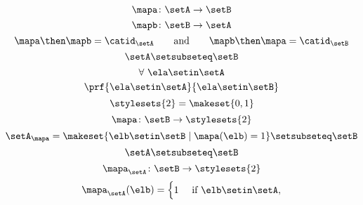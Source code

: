 \begin{forslides}
    \begin{equation}
        \label{eq:slides_session2_183}
        \mapa\colon \setA \to \setB
    \end{equation}
    \begin{equation}
        \label{eq:slides_session2_184}
        \mapb \colon \setB \to \setA
    \end{equation}
    \begin{equation}
        \label{eq:slides_session2_185}
        \mapa \then \mapb = \catid_\setA \qquad \text{and}  \qquad \mapb \then \mapa = \catid_\setB
    \end{equation}
    \begin{equation}
        \label{eq:slides_session2_186}
        \setA \setsubseteq \setB
    \end{equation}
    \begin{equation}
        \label{eq:slides_session2_187}
        \forall \ \ela \setin\setA
    \end{equation}
    \begin{equation}
        \label{eq:slides_session2_188}
        \prf{
            \ela \setin\setA
        }{
            \ela \setin\setB
        }
    \end{equation}
    \begin{equation}
        \label{eq:slides_session2_189}
        \stylesets{2} = \makeset{ 0, 1}
    \end{equation}
    \begin{equation}
        \label{eq:slides_session2_190}
        \mapa \colon \setB \to \stylesets{2}
    \end{equation}
    \begin{equation}
        \label{eq:slides_session2_191}
        \setA_\mapa = \makeset{ \elb \setin\setB \mid \mapa(\elb) = 1 } \setsubseteq \setB
    \end{equation}
    \begin{equation}
        \label{eq:slides_session2_192}
        \setA \setsubseteq \setB
    \end{equation}
    \begin{equation}
        \label{eq:slides_session2_193}
        \mapa_\setA \colon \setB \to \stylesets{2}
    \end{equation}
    \begin{equation}
        \label{eq:slides_session2_194}
        \mapa_\setA(\elb) = \begin{cases}
            1 & \text{ if }\elb\setin\setA, \\

\end{cases}
\end{equation}
\end{forslides}
